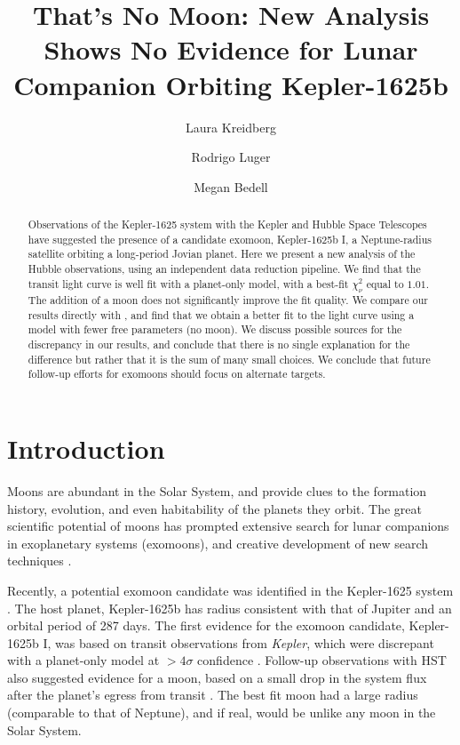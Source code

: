 \documentclass[twocolumn]{aastex62}
\newcommand{\project}[1]{\textsl{#1}}
\newcommand{\Kepler}{\project{Kepler}}
\begin{document}
\title{That's No Moon: New Analysis Shows No Evidence for Lunar Companion Orbiting Kepler-1625b}

\author{Laura Kreidberg}
\author{Rodrigo Luger}
\author{Megan Bedell}

\begin{abstract}
    Observations of the Kepler-1625 system with the Kepler and Hubble Space Telescopes have suggested the presence of a candidate exomoon, Kepler-1625b I, a Neptune-radius satellite orbiting a long-period Jovian planet. Here we present a new analysis of the Hubble observations, using an independent data reduction pipeline. We find that the transit light curve is well fit with a planet-only model, with a best-fit $\chi^2_\nu$ equal to $1.01$. The addition of a moon does not significantly improve the fit quality. We compare our results directly with \cite{teachey18b}, and find that we obtain a better fit to the light curve using a model with fewer free parameters (no moon). We discuss possible sources for the discrepancy in our results, and conclude that there is no single explanation for the difference but rather that it is the sum of many small choices. We conclude that future follow-up efforts for exomoons should focus on alternate targets.
 
\end{abstract}


\section{Introduction} \label{sec:intro}
Moons are abundant in the Solar System, and provide clues to the formation history, evolution, and even habitability of the planets they orbit. The great scientific potential of moons has prompted extensive search for lunar companions in exoplanetary systems (exomoons), and creative development of new search techniques \citep[e.g.][]{kipping09a, kipping09b, kipping13, simon10, peters13, heller14, noyola14, hippke15, agol15, sengupta16, vanderburg18}. 

Recently, a potential exomoon candidate was identified in the Kepler-1625 system \citep{teachey18a}. The host planet, Kepler-1625b has radius consistent with that of Jupiter and an orbital period of 287 days.  The first evidence for the exomoon candidate, Kepler-1625b I, was based on transit observations from \Kepler, which were discrepant with a planet-only model at $>4\sigma$ confidence \citep{teachey18a}. Follow-up observations with HST also suggested evidence for a moon, based on a small drop in the system flux after the planet's egress from transit \citep{teachey18b}. The best fit moon had a large radius (comparable to that of Neptune), and if real, would be unlike any moon in the Solar System.
\end{document}
